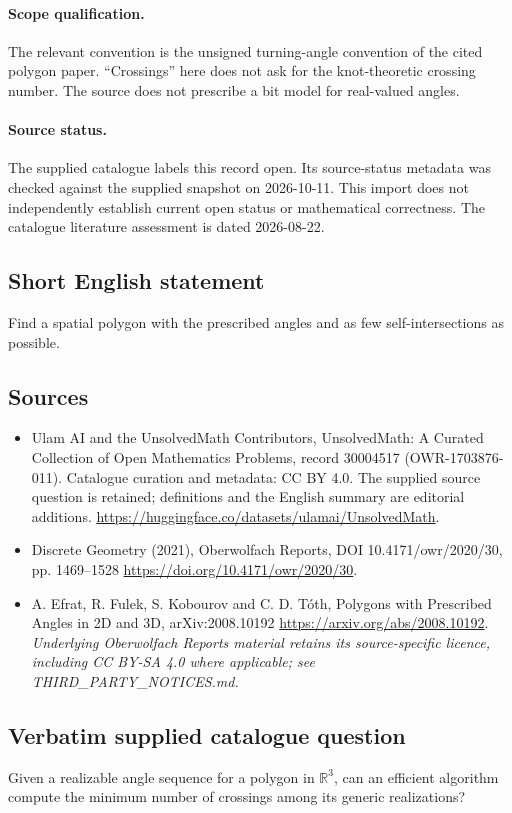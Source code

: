 \documentclass[11pt]{article}
\begin{document}
\paragraph{Scope qualification.}
The relevant convention is the unsigned turning-angle convention of the cited polygon paper. ``Crossings'' here does not ask for the knot-theoretic crossing number. The source does not prescribe a bit model for real-valued angles.
\paragraph{Source status.}
The supplied catalogue labels this record open. Its source-status metadata was checked against the supplied snapshot on 2026-10-11. This import does not independently establish current open status or mathematical correctness. The catalogue literature assessment is dated 2026-08-22.
\subsection{Short English statement}
Find a spatial polygon with the prescribed angles and as few self-intersections as possible.
\subsection{Sources}
\begin{itemize}
\item[S1] Ulam AI and the UnsolvedMath Contributors, UnsolvedMath: A Curated Collection of Open Mathematics Problems, record 30004517 (OWR-1703876-011). Catalogue curation and metadata: CC BY 4.0. The supplied source question is retained; definitions and the English summary are editorial additions.
\url{https://huggingface.co/datasets/ulamai/UnsolvedMath}.
\item[S2] Discrete Geometry (2021), Oberwolfach Reports, DOI 10.4171/owr/2020/30, pp. 1469--1528
\url{https://doi.org/10.4171/owr/2020/30}.
\item[S3] A. Efrat, R. Fulek, S. Kobourov and C. D. Tóth, Polygons with Prescribed Angles in 2D and 3D, arXiv:2008.10192
\url{https://arxiv.org/abs/2008.10192}.
\textit{Underlying Oberwolfach Reports material retains its source-specific licence, including CC BY-SA 4.0 where applicable; see THIRD\_PARTY\_NOTICES.md.}
\end{itemize}
\subsection{Verbatim supplied catalogue question}
Given a realizable angle sequence for a polygon in $\mathbb{R}^3$, can an efficient algorithm compute the minimum number of crossings among its generic realizations?
\end{document}
